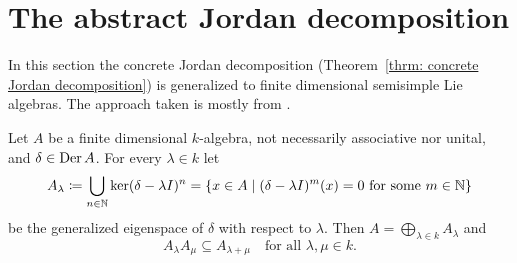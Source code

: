 \section{The abstract Jordan decomposition}
In this section the concrete Jordan decomposition (Theorem~\ref{thrm: concrete Jordan decomposition}) is generalized to finite dimensional semisimple Lie algebras. The approach taken is mostly from \cite[\S 4.2, \S 5.3, \S 5.4, \S 6.4]{Humphreys}.


\begin{lem}\label{lem: generalized eigenspace decomposition for derivations}
 Let $A$ be a finite dimensional $k$-algebra, not necessarily associative nor unital, and $\delta \in \operatorname{Der} A$. For every $\lambda \in k$ let
 \[
  A_\lambda
  \coloneqq \bigcup_{n \in \mathbb{N}} \ker(\delta-\lambda I)^n
  = \{x \in A \mid \text{$(\delta-\lambda I)^m(x) = 0$ for some $m \in \mathbb{N}$}\}
 \]
 be the generalized eigenspace of $\delta$ with respect to $\lambda$. Then $A = \bigoplus_{\lambda \in k} A_\lambda$ and
 \[
  A_\lambda A_\mu \subseteq A_{\lambda + \mu} \quad \text{for all $\lambda, \mu \in k$}.
 \]
\end{lem}
